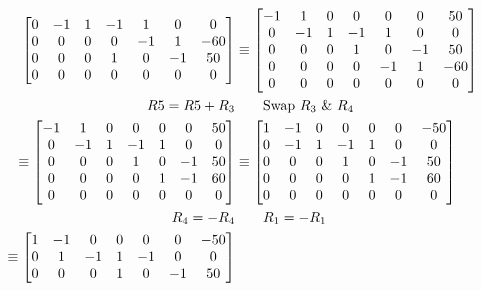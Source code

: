 \documentclass{../mathhomework}
\newenvironment{Mat}{\begin{bmatrix}}{\end{bmatrix}}
\begin{document}
\begin{problem}[1.6\#13]
\begin{solution}[Part A:]
\begin{align*}
\begin{Mat}
                0 & -1 & 1 & -1 & 1 & 0 & 0 \\
                0 & 0 & 0 & 0 & -1 & 1 & -60 \\
                0 & 0 & 0 & 1 & 0 & -1 & 50 \\ 
                0 & 0 & 0 & 0 & 0 & 0 & 0
            \end{Mat}
            & \equiv 
            \begin{Mat}
                -1 & 1 & 0 & 0 & 0 & 0 & 50 \\ 
                0 & -1 & 1 & -1 & 1 & 0 & 0 \\
                0 & 0 & 0 & 1 & 0 & -1 & 50 \\ 
                0 & 0 & 0 & 0 & -1 & 1 & -60 \\
                0 & 0 & 0 & 0 & 0 & 0 & 0
            \end{Mat}
            \\ 
            R5 = R5 + R_3 & \qquad{} \text{Swap $R_3$ \& $R_4$} \\
            \equiv \begin{Mat}
                -1 & 1 & 0 & 0 & 0 & 0 & 50 \\ 
                0 & -1 & 1 & -1 & 1 & 0 & 0 \\
                0 & 0 & 0 & 1 & 0 & -1 & 50 \\ 
                0 & 0 & 0 & 0 & 1 & -1 & 60 \\
                0 & 0 & 0 & 0 & 0 & 0 & 0
            \end{Mat}
            & \equiv \begin{Mat}
                1 & -1 & 0 & 0 & 0 & 0 & -50 \\ 
                0 & -1 & 1 & -1 & 1 & 0 & 0 \\
                0 & 0 & 0 & 1 & 0 & -1 & 50 \\ 
                0 & 0 & 0 & 0 & 1 & -1 & 60 \\
                0 & 0 & 0 & 0 & 0 & 0 & 0
            \end{Mat}
            \\ 
            R_4 = -R_4 & \qquad{} R_1 = -R_1 \\
            \equiv \begin{Mat}
                1 & -1 & 0 & 0 & 0 & 0 & -50 \\ 
                0 & 1 & -1 & 1 & -1 & 0 & 0 \\
                0 & 0 & 0 & 1 & 0 & -1 & 50 \\ 

\end{Mat}
\end{align*}
\end{solution}
\end{problem}
\end{document}
